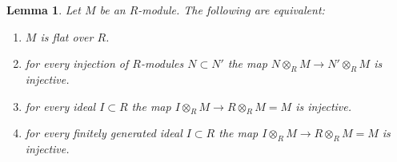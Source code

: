 \documentclass{amsart}
\theoremstyle{plain}
\newtheorem{lemma}[subsection]{Lemma}
\theoremstyle{definition}
\theoremstyle{remark}
\numberwithin{equation}{subsection}
\begin{document}
\begin{lemma}
\label{lemma-flat}
Let $M$ be an $R$-module. The following are equivalent:
\begin{enumerate}
\item
\label{item-flat}
$M$ is flat over $R$.
\item
\label{item-injective}
for every injection of $R$-modules $N \subset N'$
the map $N \otimes_R M \to N'\otimes_R M$ is injective.
\item
\label{item-f-ideal}
for every ideal $I \subset R$ the map
$I \otimes_R M \to R \otimes_R M = M$ is injective.
\item
\label{item-ffg-ideal}
for every finitely generated ideal $I \subset R$
the map $I \otimes_R M \to R \otimes_R M = M$ is injective.
\end{enumerate}
\end{lemma}
\end{document}
